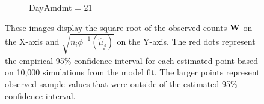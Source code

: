 \documentclass{template}
\begin{document}
\begin{figure}[ht!]
\begin{subfigure}[b]{0.40\textheight}
        \caption{DayAmdmt = 21}
    \end{subfigure}
    \caption{These images display the square root of the observed counts $\mathbf{W}$ on the X-axis and $\sqrt{n_i\phi^{-1}(\hat{\mu}_j)}$ on the Y-axis. The red dots represent the empirical 95\% confidence interval for each estimated point based on 10,000 simulations from the model fit. The larger points represent observed sample values that were outside of the estimated 95\% confidence interval. }\label{fig:FitBar}
\end{figure}


\end{document}
